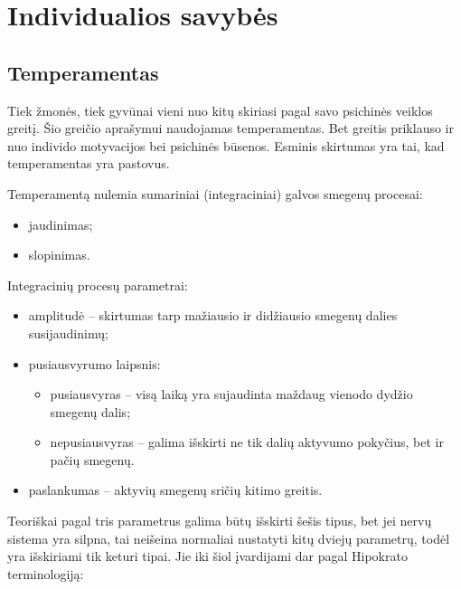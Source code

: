 \chapter{Individualios savybės}

\label{tema:individualios_savybes}

\section{Temperamentas}

Tiek žmonės, tiek gyvūnai vieni nuo kitų skiriasi pagal savo psichinės 
veiklos greitį. Šio greičio aprašymui naudojamas \gls{temperamentas}. 
Bet greitis priklauso ir nuo individo motyvacijos bei psichinės būsenos. 
Esminis skirtumas yra tai, kad temperamentas yra pastovus.

Temperamentą nulemia %
sumariniai (integraciniai) galvos smegenų procesai:

\begin{itemize}
  \item jaudinimas; 
  \item slopinimas.
\end{itemize}

Integracinių procesų parametrai:

\begin{itemize}
  \item amplitudė – skirtumas tarp mažiausio ir didžiausio smegenų dalies
    susijaudinimų;
  \item pusiausvyrumo laipsnis:
    \begin{itemize}
      \item pusiausvyras – visą laiką yra sujaudinta maždaug vienodo
        dydžio smegenų dalis;
      \item nepusiausvyras – galima išskirti ne tik dalių aktyvumo pokyčius,
        bet ir pačių smegenų.
    \end{itemize}
  \item paslankumas – aktyvių smegenų sričių kitimo greitis.
\end{itemize}

Teoriškai pagal tris parametrus galima būtų išskirti šešis tipus, bet
jei nervų sistema yra silpna, tai neišeina normaliai nustatyti kitų dviejų
parametrų, todėl yra išskiriami tik keturi tipai. Jie iki šiol įvardijami
dar pagal Hipokrato terminologiją:

